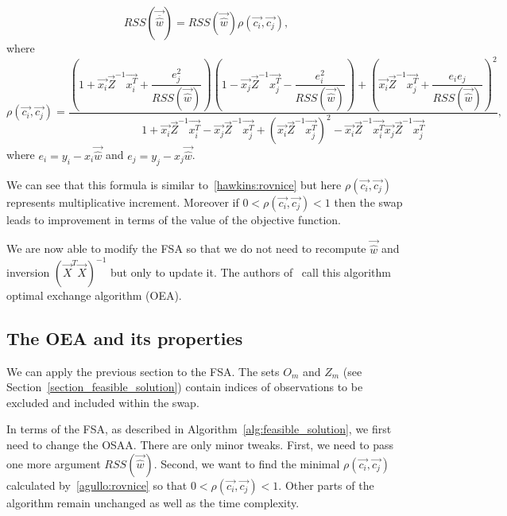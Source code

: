 \begin{equation} \label{updaterss}
    RSS(\vec{\overline{\hat{w}}})  = RSS(\vec{\hat{w}})\rho(\vec{c_i}, \vec{c_j}),
\end{equation}
where
\begin{equation} \label{agullo:rovnice}
    \rho(\vec{c_i}, \vec{c_j}) =
     \dfrac
     {(1+\vec{x_i}\vec{Z}^{-1}\vec{x_i^T} + \dfrac{e_j^2}{RSS(\vec{\hat{w}})})
        (1 - \vec{x_j}\vec{Z}^{-1}\vec{x_j^T} - \dfrac{e_i^2}{RSS(\vec{\hat{w}})} )+
        (\vec{x_i}\vec{Z}^{-1}\vec{x_j^T} + \dfrac{e_i e_j}{RSS(\vec{\hat{w}})} )^2}
    {1 + \vec{x_i}\vec{Z}^{-1}\vec{x_i^T}  - \vec{x_j}\vec{Z}^{-1}\vec{x_j^T}  + ( \vec{x_i}\vec{Z}^{-1}\vec{x_j^T})^2 -   \vec{x_i}\vec{Z}^{-1}\vec{x_i^T}\vec{x_j}\vec{Z}^{-1}\vec{x_j^T} },
\end{equation}
where $e_i = y_i - x_i\vec{\hat{w}}$ and $e_j = y_j - x_j\vec{\hat{w}}$.

We can see that this formula is similar to~\eqref{hawkins:rovnice} but here $\rho(\vec{c_i}, \vec{c_j})$ represents multiplicative increment. Moreover if $0 < \rho(\vec{c_i}, \vec{c_j})< 1$ then the swap leads to improvement in terms of the value of the objective function.

We are now able to modify the FSA so that we do not need to recompute $\vec{\hat{w}}$ and inversion $(\vec{X}^T \vec{X})^{-1}$ but only to update it. The authors of~\cite{agullo2001new} call this algorithm optimal exchange algorithm (OEA).






\subsection{The OEA and its properties}
We can apply the previous section to the FSA. The sets $O_m$ and $Z_m$ (see Section~\ref{section_feasible_solution}) contain indices of observations to be excluded and included within the swap.

In terms of the FSA, as described in Algorithm~\ref{alg:feasible_solution}, we first need to change the OSAA.  There are only minor tweaks. First, we need to pass one more argument $RSS(\vec{\hat{w}})$. Second, we want to find the minimal $\rho(\vec{c_i}, \vec{c_j})$ calculated by~\eqref{agullo:rovnice} so that $0 < \rho(\vec{c_i}, \vec{c_j}) < 1 $. Other parts of the algorithm remain unchanged as well as the time complexity.

